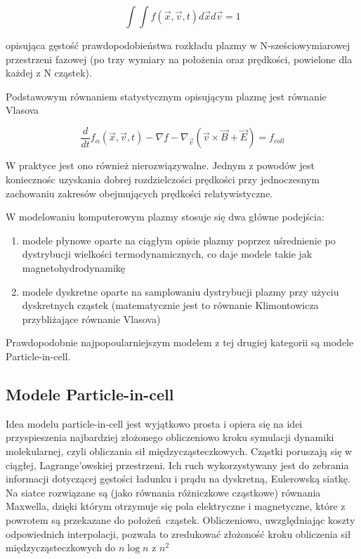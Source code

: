 \begin{equation}
    \int \int f(\vec{x}, \vec{v}, t) d\vec{x} d\vec{v} = 1 %
\end{equation}

opisująca gęstość prawdopodobieństwa rozkładu plazmy w N-sześciowymiarowej przestrzeni fazowej (po trzy wymiary na położenia
oraz prędkości, powielone dla każdej z N cząstek).


Podstawowym równaniem statystycznym opisującym plazmę jest równanie Vlasova %

\begin{equation}
    \frac{ d} {dt} f_{\alpha} (\vec{x}, \vec{v}, t) - \nabla f - \nabla_\vec{v} (\vec{v} \times \vec{B} + \vec{E})= f_{coll}
\end{equation}

W praktyce jest ono również nierozwiązywalne. Jednym z powodów jest koniecznośc uzyskania dobrej rozdzielczości prędkości
przy jednoczesnym zachowaniu zakresów obejmujących prędkości relatywistyczne. %

W modelowaniu komputerowym plazmy stosuje się dwa główne podejścia:
\begin{enumerate}
\item modele płynowe oparte na ciągłym opisie plazmy poprzez uśrednienie po dystrybucji
wielkości termodynamicznych, co daje modele takie jak magnetohydrodynamikę %
\item modele dyskretne oparte na samplowaniu dystrybucji plazmy przy użyciu dyskretnych cząstek
        (matematycznie jest to równanie Klimontowicza przybliżające równanie Vlasova) %
\end{enumerate}

Prawdopodobnie najpopoularniejszym modelem z tej drugiej kategorii są modele Particle-in-cell.

\subsection{Modele Particle-in-cell}

Idea modelu particle-in-cell jest wyjątkowo prosta i opiera się na idei przyspieszenia najbardziej złożonego obliczeniowo kroku
symulacji dynamiki molekularnej, czyli obliczania sił międzycząsteczkowych. Cząstki poruszają się w ciągłej, Lagrange'owskiej przestrzeni.
Ich ruch wykorzystywany jest do zebrania informacji dotyczącej gęstości ładunku i prądu na dyskretną, Eulerowską siatkę. Na siatce rozwiązane
są (jako równania różniczkowe cząstkowe) równania Maxwella, dzięki którym otrzymuje się pola elektryczne i magnetyczne, które z powrotem są przekazane
do położeń cząstek. Obliczeniowo, uwzględniając koszty odpowiednich interpolacji, pozwala to zredukować złożoność kroku obliczenia sił międzycząsteczkowych
do $n \log{n}$ z $n^2$ %


